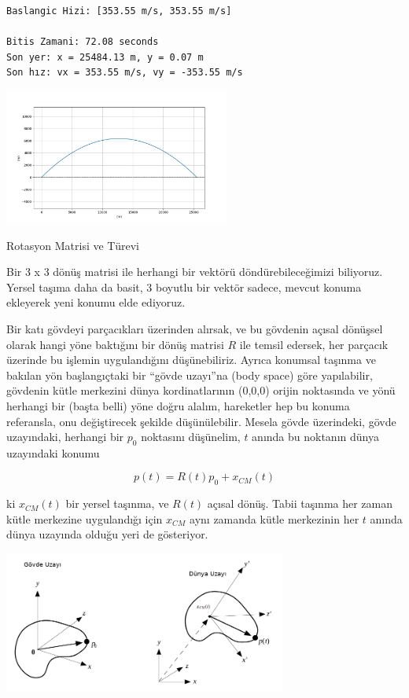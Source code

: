 \documentclass[12pt,fleqn]{article}\usepackage{../../common}
\begin{document}
\begin{verbatim}
Baslangic Hizi: [353.55 m/s, 353.55 m/s]

Bitis Zamani: 72.08 seconds
Son yer: x = 25484.13 m, y = 0.07 m
Son hız: vx = 353.55 m/s, vy = -353.55 m/s
\end{verbatim}

\includegraphics[width=20em]{phy_005_basics_05_05.jpg}


Rotasyon Matrisi ve Türevi

Bir 3 x 3 dönüş matrisi ile herhangi bir vektörü döndürebileceğimizi biliyoruz.
Yersel taşıma daha da basit, 3 boyutlu bir vektör sadece, mevcut konuma
ekleyerek yeni konumu elde ediyoruz.

Bir katı gövdeyi parçacıkları üzerinden alırsak, ve bu gövdenin açısal dönüşsel
olarak hangi yöne baktığını bir dönüş matrisi $R$ ile temsil edersek, her
parçacık üzerinde bu işlemin uygulandığını düşünebiliriz. Ayrıca konumsal
taşınma ve bakılan yön başlangıçtaki bir ``gövde uzayı''na (body space) göre
yapılabilir, gövdenin kütle merkezini dünya kordinatlarının (0,0,0) orijin
noktasında ve yönü herhangi bir (başta belli) yöne doğru alalım, hareketler hep
bu konuma referansla, onu değiştirecek şekilde düşünülebilir.  Mesela gövde
üzerindeki, gövde uzayındaki, herhangi bir $p_0$ noktasını düşünelim, $t$ anında
bu noktanın dünya uzayındaki konumu

$$
p(t) = R(t) p_0 + x_{CM}(t)
$$

ki $x_{CM}(t)$ bir yersel taşınma, ve $R(t)$ açısal dönüş. Tabii taşınma her
zaman kütle merkezine uygulandığı için $x_{CM}$ aynı zamanda kütle merkezinin
her $t$ anında dünya uzayında olduğu yeri de gösteriyor.

\includegraphics[width=25em]{phy_005_basics_04_04.png}
\end{document}
